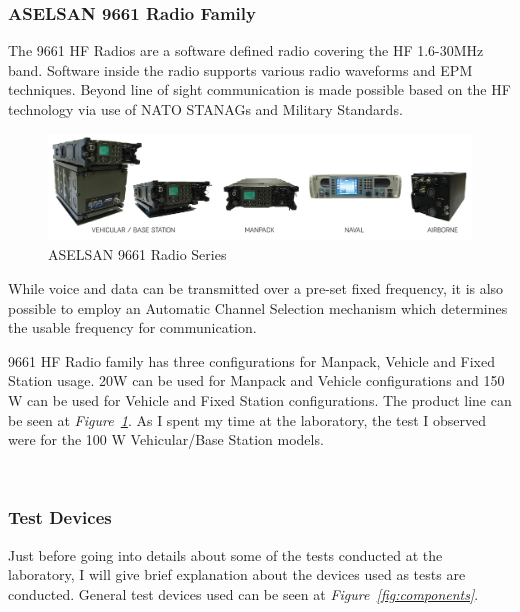 \subsubsection{ASELSAN 9661 Radio Family}
\- \indent	
	The 9661 HF Radios are a software defined radio covering the HF 1.6-30MHz band. Software inside the radio supports various radio waveforms and EPM techniques. Beyond line of sight communication is made possible based on the HF technology via use of NATO STANAGs and Military Standards\cite{9661}. 


\begin{figure}[H]
	\center
	\setlength{\unitlength}{\textwidth} 
	\includegraphics[width=1.0\unitlength]{radio_type}
	\caption{\label{fig:radtyp}ASELSAN 9661 Radio Series\cite{9661} }
\end{figure}

	 While voice and data can be transmitted over a pre-set fixed frequency, it is also possible to employ an Automatic Channel Selection mechanism which determines the usable frequency for communication.

	


	
	9661 HF Radio family has three configurations for Manpack, Vehicle and Fixed Station usage. 20W can be used for Manpack and Vehicle configurations and 150 W can be used for Vehicle and Fixed Station configurations. The product line can be seen at \textit{Figure~\ref{fig:radtyp}}. As I spent my time at the laboratory, the test I observed were for the 100 W Vehicular/Base Station models. 

\- \\[2cm]




\subsubsection{Test Devices}
\- \indent
	Just before going into details about some of the tests conducted at the laboratory, I will give brief explanation about the devices used as tests are conducted. General test devices used can be seen at \textit{Figure~\ref{fig:components}}.

